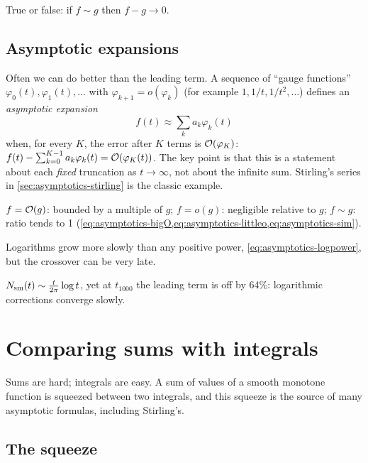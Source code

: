 \begin{checkpoint}
True or false: if $f\sim g$ then $f-g\to0$.
\end{checkpoint}

\subsection{Asymptotic expansions}

Often we can do better than the leading term. A sequence of ``gauge functions'' $\varphi_0(t),\varphi_1(t),\dots$ with $\varphi_{k+1}=o(\varphi_k)$ (for example $1,1/t,1/t^2,\dots$) defines an \emph{asymptotic expansion}
\[
f(t)\approx\sum_{k}a_k\varphi_k(t)
\]
when, for every $K$, the error after $K$ terms is $\mathcal{O}(\varphi_K)$:
$f(t)-\sum_{k=0}^{K-1}a_k\varphi_k(t)=\mathcal{O}(\varphi_K(t))$. The key point is that this is a statement about each \emph{fixed} truncation as $t\to\infty$, not about the infinite sum. Stirling's series in \cref{sec:asymptotics-stirling} is the classic example.

\begin{keyideas}
\item $f=\mathcal{O}(g)$: bounded by a multiple of $g$; $f=o(g)$: negligible relative to $g$; $f\sim g$: ratio tends to 1 (\cref{eq:asymptotics-bigO,eq:asymptotics-littleo,eq:asymptotics-sim}).
\item Logarithms grow more slowly than any positive power, \cref{eq:asymptotics-logpower}, but the crossover can be very late.
\item $N_{\mathrm{sm}}(t)\sim\frac{t}{2\pi}\log t$, yet at $t_{1000}$ the leading term is off by 64\%: logarithmic corrections converge slowly.
\end{keyideas}

\section{Comparing sums with integrals}\label{sec:asymptotics-sums}

Sums are hard; integrals are easy. A sum of values of a smooth monotone function is squeezed between two integrals, and this squeeze is the source of many asymptotic formulas, including Stirling's.

\subsection{The squeeze}

